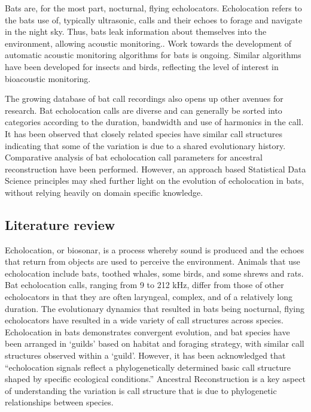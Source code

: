 \documentclass[wsdraft]{ws-rv9x6} %
\begin{document}
Bats are, for the most part, nocturnal, flying echolocators.\cite{kunz1994bats} Echolocation refers to the bats use of, typically ultrasonic\cite{corso1963bone}, calls and their echoes to forage and navigate in the night sky.\cite{griffin1944echolocation} Thus, bats leak information about themselves into the environment, allowing acoustic monitoring.\cite{pettorelli2013indicator}. Work towards the development of automatic acoustic monitoring algorithms for bats \cite{stathopoulos2017bat} \cite{walters2012continental} is ongoing. Similar algorithms have been developed for insects\cite{chesmore2004automated} and birds\cite{briggs2012acoustic}, reflecting the level of interest in bioacoustic monitoring.

The growing database of bat call recordings \cite{collen2012evolution} also opens up other avenues for research. Bat echolocation calls are diverse and can generally be sorted into categories according to the duration, bandwidth and use of harmonics in the call.\cite{maltby20104} It has been observed that closely related species have similar call structures indicating that some of the variation is due to a shared evolutionary history.\cite{jones2006evolution} Comparative analysis of bat echolocation call parameters for ancestral reconstruction\cite{joy2016ancestral} have been performed.\cite{collen2012evolution} However, an approach based Statistical Data Science principles may shed further light on the evolution of echolocation in bats, without relying heavily on domain specific knowledge.
 
\subsection{Literature review}

Echolocation, or biosonar, is a process whereby sound is produced and the echoes that return from objects are used to perceive the environment.\cite{jones2005echolocation} Animals that use echolocation include bats, toothed whales, some birds, and some shrews and rats.\cite{jones2005echolocation} Bat echolocation calls, ranging from 9 to 212 kHz, differ from those of other echolocators in that they are often laryngeal, complex, and of a relatively long duration.\cite{thomas2004echolocation} The evolutionary dynamics that resulted in bats being nocturnal, flying echolocators have resulted in a wide variety of call structures across species.\cite{jones2006evolution} Echolocation in bats demonstrates convergent evolution, and bat species have been arranged in `guilds' based on habitat and foraging strategy, with similar call structures observed within a `guild'. \cite{aldridge1987morphology} \cite{neuweiler1990auditory} \cite{schnitzler2001echolocation} However, it has been acknowledged that ``echolocation signals reflect a phylogenetically determined basic call structure shaped by specific ecological conditions.''\cite{schnitzler2004evolution} Ancestral Reconstruction is a key aspect of understanding the variation is call structure that is due to phylogenetic relationships between species. 
\end{document}
